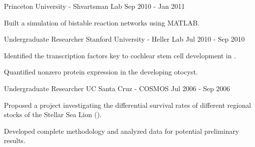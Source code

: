 \begin{cventries}
    {Princeton University - Shvartsman Lab} %
    {} %
    {Sep 2010 - Jan 2011} %
    {
      \begin{cvitems} %
        \item Built a simulation of bistable reaction networks using MATLAB.
      \end{cvitems}
    }
  \cventry
    {Undergraduate Researcher} %
    {Stanford University - Heller Lab} %
    {} %
    {Jul 2010 - Sep 2010} %
    {
      \begin{cvitems} %
        \item Identified the transcription factors key to cochlear stem cell development in \gal.
        \item Quantified nonzero protein expression in the developing otocyst.
      \end{cvitems}
    }
  \cventry
    {Undergraduate Researcher} %
    {UC Santa Cruz - COSMOS} %
    {} %
    {Jul 2006 - Sep 2006} %
    {
      \begin{cvitems} %
        \item Proposed a project investigating the differential survival rates of different regional stocks of the Stellar Sea Lion (\ejub).
        \item Developed complete methodology and analyzed data for potential preliminary results.
      \end{cvitems}
    }
\fi
\end{cventries}
